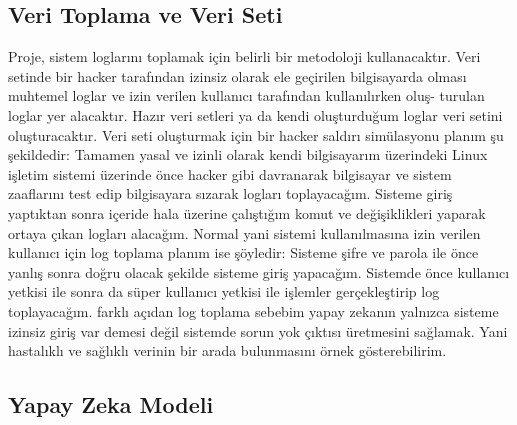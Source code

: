 \documentclass[12pt,a4paper]{article}
\begin{document}
\begin{enumerate}
\begin{itemize}
\subsection{Veri Toplama ve Veri Seti}
Proje, sistem loglarını toplamak için belirli bir metodoloji kullanacaktır. Veri setinde bir hacker tarafından izinsiz olarak ele geçirilen bilgisayarda
olması muhtemel loglar ve izin verilen kullanıcı tarafından kullanılırken oluş-
turulan loglar yer alacaktır. Hazır veri setleri ya da kendi oluşturduğum
loglar veri setini oluşturacaktır.\newline\newline
Veri seti oluşturmak için bir hacker saldırı simülasyonu planım şu şekildedir: Tamamen yasal ve izinli olarak kendi bilgisayarım üzerindeki Linux işletim sistemi üzerinde önce hacker gibi davranarak bilgisayar ve sistem zaaflarını test edip bilgisayara sızarak logları toplayacağım. Sisteme giriş yaptıktan sonra içeride hala üzerine çalıştığım komut ve değişiklikleri yaparak ortaya çıkan logları alacağım.
\newline\newpage
Normal yani sistemi kullanılmasına izin verilen kullanıcı için log toplama planım ise şöyledir: Sisteme şifre ve parola ile önce yanlış sonra doğru olacak şekilde sisteme giriş yapacağım. Sistemde önce kullanıcı yetkisi ile sonra da süper kullanıcı yetkisi ile işlemler gerçekleştirip log toplayacağım.\newline{} farklı açıdan log toplama sebebim yapay zekanın yalnızca sisteme izinsiz
giriş var demesi değil sistemde sorun yok çıktısı üretmesini sağlamak. Yani
hastalıklı ve sağlıklı verinin bir arada bulunmasını örnek gösterebilirim.
\newline

\subsection{ Yapay Zeka Modeli}


\end{itemize}
\end{enumerate}
\end{document}
